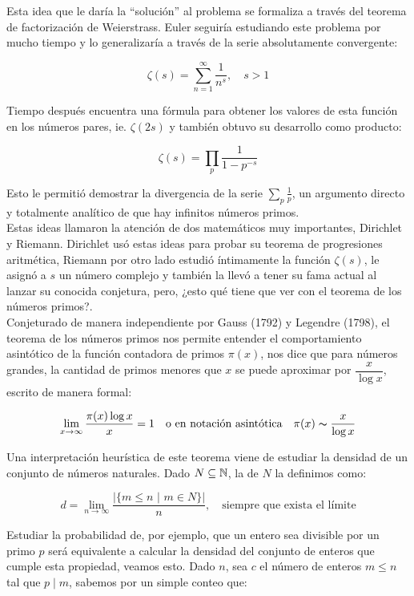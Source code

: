 Esta idea que le daría la ``solución'' al problema se formaliza a través del teorema de factorización de Weierstrass. Euler seguiría estudiando este problema por mucho tiempo y lo generalizaría a través de la serie absolutamente convergente:

$$\zeta(s)=\sum_{n=1}^{\infty}\frac{1}{n^s}, \quad s>1$$

Tiempo después encuentra una fórmula para obtener los valores de esta función en los números pares, ie. $\zeta(2s)$ y también obtuvo su desarrollo como producto:

$$\zeta(s)=\prod_{p}\frac{1}{1-p^{-s}}$$

Esto le permitió demostrar la divergencia de la serie $\displaystyle \sum_p\frac{1}{p}$, un argumento directo y totalmente analítico de que hay infinitos números primos.\\

Estas ideas llamaron la atención de dos matemáticos muy importantes, Dirichlet y Riemann. Dirichlet usó estas ideas para probar su teorema de progresiones aritmética, Riemann por otro lado estudió íntimamente la función $\zeta(s)$, le asignó a $s$ un número complejo y también la llevó a tener su fama actual al lanzar su conocida conjetura, pero, ¿esto qué tiene que ver con el teorema de los números primos?.\\

Conjeturado de manera independiente por Gauss (1792) y Legendre (1798), el teorema de los números primos nos permite entender el comportamiento asintótico de la función contadora de  primos $\pi(x)$, nos dice  que para números grandes, la cantidad de primos menores que $x$ se puede aproximar por $\dfrac{x}{\log x}$, escrito de manera formal:

$$\lim_{x \to \infty}\dfrac{\pi(x)\log x}{x}=1 \quad \text{o en notación asintótica} \quad \pi(x)\thicksim \dfrac{x}{\log x}$$

\vspace*{1cm}

Una interpretación heurística de este teorema viene de estudiar la densidad de un conjunto de números naturales. Dado $N\subseteq \mathbb{N}$, la  de $N$ la definimos como:

$$d=\lim_{n\to \infty}\frac{|\{m\leq n \text{ | }m\in N\}|}{n}, \quad \text{siempre que exista el límite}$$

Estudiar la probabilidad de, por ejemplo, que un entero sea divisible por un primo $p$ será equivalente a calcular la densidad del conjunto de enteros que cumple esta propiedad, veamos esto. Dado $n$, sea  $c$ el número de enteros $m\leq n$ tal que $p\mid m$, sabemos por un simple conteo que:

